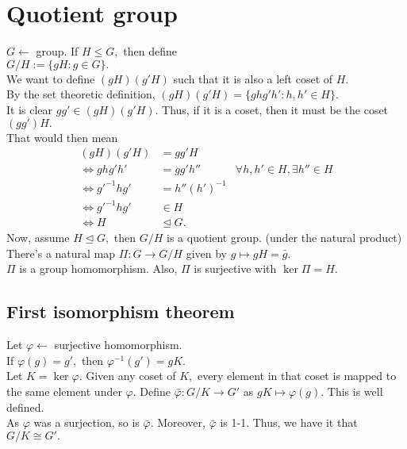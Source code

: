 \documentclass[12 pt, a4paper, toc=graduated, oneside]{article}
\theoremstyle{definition}
\begin{document}
\section{Quotient group}
$G \longleftarrow$ group. If $H \le G,$ then define\\
$G/H := \{gH : g \in G\}.$\\
We want to define $(gH)(g'H)$ such that it is also a left coset of $H.$\\
By the set theoretic definition, $(gH)(g'H) = \{ghg'h' : h, h' \in H\}.$ \\
It is clear $gg' \in (gH)(g'H).$ Thus, if it is a coset, then it must be the coset $(gg')H.$\\
That would then mean
\begin{align*}
	(gH)(g'H) &= gg'H\\
	\iff ghg'h' &= gg'h'' & \forall h, h' \in H, \exists h'' \in H\\
	\iff g'^{-1}hg' &= h''(h')^{-1}\\
	\iff g'^{-1}hg' &\in H\\
	\iff H &\trianglelefteq G.
\end{align*}
Now, assume $H \trianglelefteq G,$ then $G/H$ is a quotient group. (under the natural product)\\
There's a natural map $\Pi : G \to G/H$ given by $g \mapsto gH = \bar{g}.$\\
$\Pi$ is a group homomorphism. Also, $\Pi$ is surjective with $\ker \Pi = H.$
\subsection{First isomorphism theorem}

\begin{center}
\end{center}

Let $\varphi \longleftarrow$ surjective homomorphism.\\
If $\varphi(g) = g',$ then $\varphi^{-1}(g') = gK.$\\
Let $K = \ker \varphi$. Given any coset of $K,$ every element in that coset is mapped to the same element under $\varphi.$ Define $\bar{\varphi} : G/K \to G'$ as $gK \mapsto \varphi(g).$ This is well defined.\\
As $\varphi$ was a surjection, so is $\bar{\varphi}.$ Moreover, $\bar{\varphi}$ is 1-1. Thus, we have it that $G/K \cong G'.$
\end{document}

